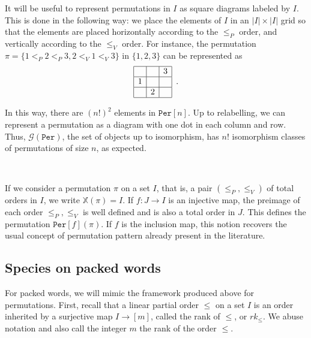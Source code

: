 \documentclass[12pt, reqno]{amsart}
\theoremstyle{definition}
\begin{document}
It will be useful to represent permutations in $I$ as square diagrams labeled by $I$.
This is done in the following way: we place the elements of $I$ in an $|I| \times |I|$ grid so that the elements are placed horizontally according to the $\leq_P$ order, and vertically according to the $\leq_V$ order.
For instance, the permutation $\pi = \{1<_P2<_P3 , 2<_V1<_V3\}$ in $\{1, 2, 3\}$ can be represented as 
\begin{equation}
\begin{array}{|c|c|c|}
	\hline & & 3 \\
    \hline 1 & &  \\
    \hline & 2 & \\
    \hline 
\end{array}\, \, \, .
\end{equation}

In this way, there are $(n!)^2 $ elements in $\mathtt{Per}[n]$.
Up to relabelling, we can represent a permutation as a diagram with one dot in each column and row.
Thus, $\mathcal{G}(\mathtt{Per})$, the set of objects up to isomorphism, has $n!$ isomorphism classes of permutations of size $n$, as expected.

\

\label{defin:per}
If we consider a permutation $\pi$ on a set $I$, that is, a pair $(\leq_P, \leq_V) $ of total orders in $I$, we write $\mathbb{X}(\pi) = I$.
If $f:J \to I $ is an injective map, the preimage of each order $\leq_P, \leq_V$ is well defined and is also a total order in $J$.
This defines the permutation $\mathtt{Per}[f](\pi )$.
If $f$ is the inclusion map, this notion recovers the usual concept of permutation pattern already present in the literature.





\subsection{Species on packed words}


For packed words, we will mimic the framework produced above for permutations.
First, recall that a linear partial order $\leq$ on a set $I$ is an order inherited by a surjective map $I \to [m]$, called the rank of $\leq$, or $rk_{\leq}$.
We abuse notation and also call the integer $m$ the rank of the order $\leq$.
\end{document}

